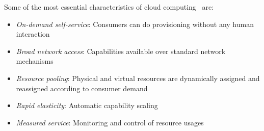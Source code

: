 
Some of the most essential characteristics of cloud computing~\cite{nist:mell11} are:
\begin{itemize}
  \item \emph{On-demand self-service}: Consumers can do provisioning without any human interaction
  \item \emph{Broad network access}: Capabilities available over standard network mechanisms
  \item \emph{Resource pooling}: Physical and virtual resources are dynamically assigned
    and reassigned according to consumer demand
  \item \emph{Rapid elasticity}: Automatic capability scaling
  \item \emph{Measured service}: Monitoring and control of resource usages
\end{itemize}

